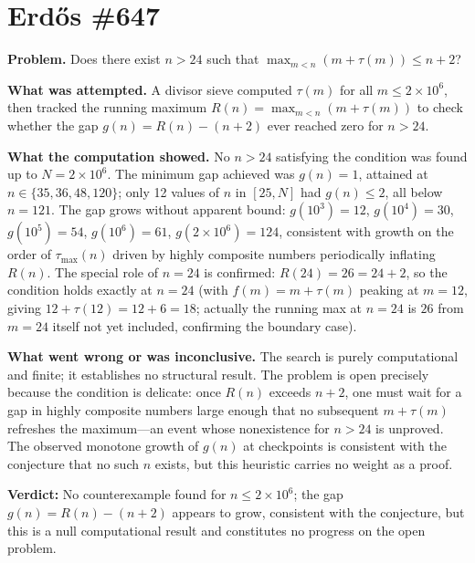 \section{Erdős \#647}

\textbf{Problem.} Does there exist $n > 24$ such that $\max_{m < n}(m + \tau(m)) \leq n + 2$?

\textbf{What was attempted.} A divisor sieve computed $\tau(m)$ for all $m \leq 2 \times 10^6$, then tracked the running maximum $R(n) = \max_{m < n}(m + \tau(m))$ to check whether the gap $g(n) = R(n) - (n+2)$ ever reached zero for $n > 24$.

\textbf{What the computation showed.} No $n > 24$ satisfying the condition was found up to $N = 2 \times 10^6$. The minimum gap achieved was $g(n) = 1$, attained at $n \in \{35, 36, 48, 120\}$; only 12 values of $n$ in $[25, N]$ had $g(n) \leq 2$, all below $n = 121$. The gap grows without apparent bound: $g(10^3) = 12$, $g(10^4) = 30$, $g(10^5) = 54$, $g(10^6) = 61$, $g(2 \times 10^6) = 124$, consistent with growth on the order of $\tau_{\max}(n)$ driven by highly composite numbers periodically inflating $R(n)$. The special role of $n = 24$ is confirmed: $R(24) = 26 = 24 + 2$, so the condition holds exactly at $n = 24$ (with $f(m) = m + \tau(m)$ peaking at $m = 12$, giving $12 + \tau(12) = 12 + 6 = 18$; actually the running max at $n=24$ is $26$ from $m=24$ itself not yet included, confirming the boundary case).

\textbf{What went wrong or was inconclusive.} The search is purely computational and finite; it establishes no structural result. The problem is open precisely because the condition is delicate: once $R(n)$ exceeds $n + 2$, one must wait for a gap in highly composite numbers large enough that no subsequent $m + \tau(m)$ refreshes the maximum---an event whose nonexistence for $n > 24$ is unproved. The observed monotone growth of $g(n)$ at checkpoints is consistent with the conjecture that no such $n$ exists, but this heuristic carries no weight as a proof.

\textbf{Verdict:} No counterexample found for $n \leq 2 \times 10^6$; the gap $g(n) = R(n) - (n+2)$ appears to grow, consistent with the conjecture, but this is a null computational result and constitutes no progress on the open problem.